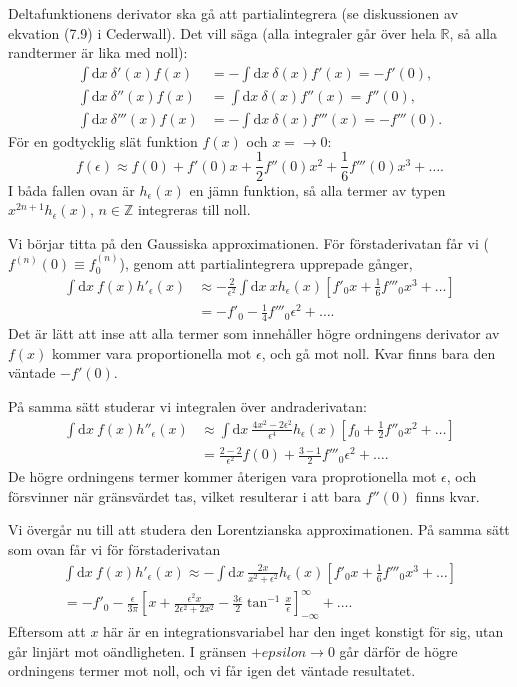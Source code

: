 \documentclass[reprint,
 amsmath,amssymb,
 aps,prl
]{revtex4-1}
\begin{document}
Deltafunktionens derivator ska gå att partialintegrera (se diskussionen av ekvation (7.9) i Cederwall). Det vill säga (alla integraler går över hela $\mathbb R$, så alla randtermer är lika med noll):
\begin{align}
    \int \mathrm dx\ \delta'(x)f(x)&=-\int \mathrm dx\ \delta(x)f'(x)=-f'(0),\\
    \int \mathrm dx\ \delta''(x)f(x)&=\int \mathrm dx\ \delta(x)f''(x)=f''(0),\\
    \int \mathrm dx\ \delta'''(x)f(x)&=-\int \mathrm dx\ \delta(x)f'''(x)=-f'''(0).\label{tredje}
\end{align}
För en godtycklig slät funktion $f(x)$ och $x=\rightarrow 0$:
\begin{equation}
    f(\epsilon)\approx f(0)+f'(0)x+\frac12f''(0)x^2+\frac16f'''(0)x^3+\ldots.
\end{equation}
I båda fallen ovan är $h_\epsilon(x)$ en jämn funktion, så alla termer av typen $x^{2n+1}h_\epsilon(x)$, $n\in\mathbb Z$ integreras till noll. 

Vi börjar titta på den Gaussiska approximationen. För förstaderivatan får vi ($f^{(n)}(0)\equiv f^{(n)}_0$), genom att partialintegrera upprepade gånger,
\begin{align}
    \int\mathrm dx\ f(x)h'_\epsilon(x)&\approx-\frac{2}{\epsilon^2}\int\mathrm dx\ xh_\epsilon(x)\left[f'_0x+\frac16f'''_0x^3+\ldots\right] \nonumber\\
    &=-f'_0-\frac14f'''_0\epsilon^2+\ldots.
\end{align}
Det är lätt att inse att alla termer som innehåller högre ordningens derivator  av $f(x)$ kommer vara proportionella mot $\epsilon$, och gå mot noll. Kvar finns bara den väntade $-f'(0)$.

På samma sätt studerar vi integralen över andraderivatan:
\begin{align}
    \int\mathrm dx\ f(x)h''_\epsilon(x)&\approx\int\mathrm dx\ \frac{4x^2-2\epsilon^2}{\epsilon^4}h_\epsilon(x)\left[f_0+\frac12f''_0x^2+\ldots\right] \nonumber\\
    &=\frac{2-2}{\epsilon^2}f(0)+\frac{3-1}2f'''_0\epsilon^2+\ldots.
\end{align}
De högre ordningens termer kommer återigen vara proprotionella mot $\epsilon$, och försvinner när gränsvärdet tas, vilket resulterar i att bara $f''(0)$ finns kvar.

Vi övergår nu till att studera den Lorentzianska approximationen. På samma sätt som ovan får vi för förstaderivatan
\begin{gather}
    \int\mathrm dx\ f(x)h'_\epsilon(x)\approx-\int\mathrm dx\ \frac{2 x}{x^2+\epsilon^2}h_\epsilon(x)\left[f'_0x+\frac16f'''_0x^3+\ldots\right] \nonumber\\
    =-f'_0-\frac\epsilon{3\pi}\left[x+\frac{\epsilon^2x}{2\epsilon^2+2x^2}-\frac{3\epsilon}2\tan^{-1}\frac x\epsilon\right]_{-\infty}^\infty+\ldots.
\end{gather}
Eftersom att $x$ här är en integrationsvariabel har den inget konstigt för sig, utan går linjärt mot oändligheten. I gränsen $+epsilon\rightarrow 0$ går därför de högre ordningens termer mot noll, och vi får igen det väntade resultatet. 
\end{document}
